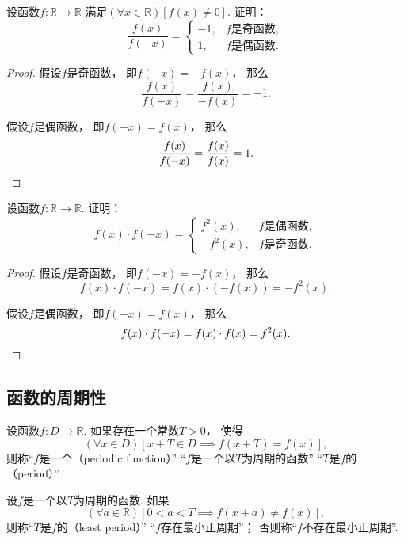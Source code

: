 \begin{example}
设函数\(f\colon\mathbb{R}\to\mathbb{R}\)
满足\((\forall x\in\mathbb{R})[f(x)\neq0]\).
证明：\[
	\frac{f(x)}{f(-x)} = \left\{ \begin{array}{rl}
		-1, & \text{$f$是奇函数}, \\
		1, & \text{$f$是偶函数}.
	\end{array} \right.
\]
\begin{proof}
假设\(f\)是奇函数，
即\(f(-x)=-f(x)\)，
那么\[
	\frac{f(x)}{f(-x)}
	=\frac{f(x)}{-f(x)}
	=-1.
\]

假设\(f\)是偶函数，
即\(f(-x)=f(x)\)，
那么\[
	\frac{f(x)}{f(-x)}
	=\frac{f(x)}{f(x)}
	=1.
	\qedhere
\]
\end{proof}
\end{example}

\begin{example}
设函数\(f\colon\mathbb{R}\to\mathbb{R}\).
证明：\[
	f(x) \cdot f(-x) = \left\{ \begin{array}{rl}
		f^2(x), & \text{$f$是偶函数}, \\
		-f^2(x), & \text{$f$是奇函数}.
	\end{array} \right.
\]
\begin{proof}
假设\(f\)是奇函数，
即\(f(-x)=-f(x)\)，
那么\[
	f(x) \cdot f(-x)
	=f(x) \cdot (-f(x))
	=-f^2(x).
\]

假设\(f\)是偶函数，
即\(f(-x)=f(x)\)，
那么\[
	f(x) \cdot f(-x)
	=f(x) \cdot f(x)
	=f^2(x).
	\qedhere
\]
\end{proof}
\end{example}

\subsection{函数的周期性}
\begin{definition}
设函数\(f\colon D\to\mathbb{R}\).
如果存在一个常数\(T>0\)，
使得\[
	(\forall x \in D)
	[x+T \in D \implies f(x+T) = f(x)],
\]
则称“\(f\)是一个（periodic function）”
“\(f\)是一个以\(T\)为周期的函数”
“\(T\)是\(f\)的（period）”.
\end{definition}

\begin{definition}
设\(f\)是一个以\(T\)为周期的函数.
如果\[
	(\forall a\in\mathbb{R})
	[0<a<T \implies f(x+a) \neq f(x)],
\]
则称“\(T\)是\(f\)的（least period）”
“\(f\)存在最小正周期”；
否则称“\(f\)不存在最小正周期”.
\end{definition}

